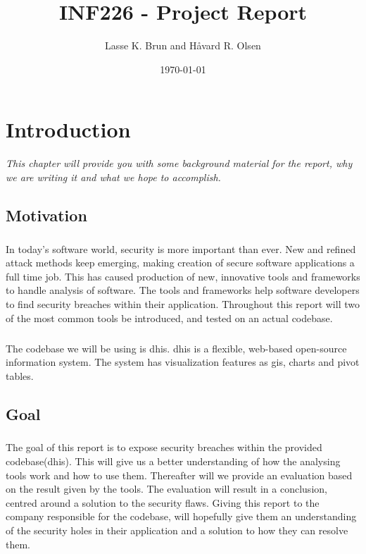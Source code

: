 \documentclass[11pt,english,a4paper]{report}
\title{INF226 - Project Report}
\date{\today}
\author{Lasse K. Brun and Håvard R. Olsen}
\begin{document}
\maketitle

\tableofcontents
\newpage

\listoffigures
\newpage

\printglossaries
\newpage


\chapter{Introduction}
\textit{This chapter will provide you with some background material for the report, why we are writing it and what we hope to accomplish.}

\section{Motivation}
\paragraph{}
In today's software world, security is more important than ever. 
New and refined attack methods keep emerging, making creation of secure software applications a full time job. 
This has caused production of new, innovative tools and frameworks to handle analysis of software. 
The tools and frameworks help software developers to find security breaches within their application. 
Throughout this report will two of the most common tools be introduced, and tested on an actual codebase.

\paragraph{}
The codebase we will be using is \gls{dhis}. \gls{dhis} is a flexible, web-based open-source information system. 
The system has visualization features as \gls{gis}, charts and pivot tables. \cite{dhis2-homepage}


\section{Goal}
\paragraph{}
The goal of this report is to expose security breaches within the provided codebase(\gls{dhis}). 
This will give us a better understanding of how the analysing tools work and how to use them. 
Thereafter will we provide an evaluation based on the result given by the tools. 
The evaluation will result in a conclusion, centred around a solution to the security flaws. 
Giving this report to the company responsible for the codebase, will hopefully give them an understanding of the security holes in their application and a solution to how they can resolve them.
\end{document}
